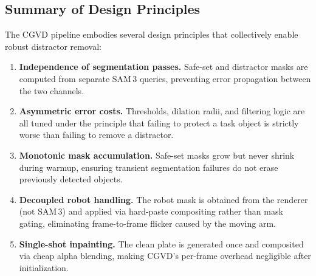 \subsection{Summary of Design Principles}
\label{sec:principles}

The CGVD pipeline embodies several design principles that collectively enable robust distractor removal:

\begin{enumerate}
    \item \textbf{Independence of segmentation passes.} Safe-set and distractor masks are computed from separate SAM\,3 queries, preventing error propagation between the two channels.
    \item \textbf{Asymmetric error costs.} Thresholds, dilation radii, and filtering logic are all tuned under the principle that failing to protect a task object is strictly worse than failing to remove a distractor.
    \item \textbf{Monotonic mask accumulation.} Safe-set masks grow but never shrink during warmup, ensuring transient segmentation failures do not erase previously detected objects.
    \item \textbf{Decoupled robot handling.} The robot mask is obtained from the renderer (not SAM\,3) and applied via hard-paste compositing rather than mask gating, eliminating frame-to-frame flicker caused by the moving arm.
    \item \textbf{Single-shot inpainting.} The clean plate is generated once and composited via cheap alpha blending, making CGVD's per-frame overhead negligible after initialization.
\end{enumerate}

